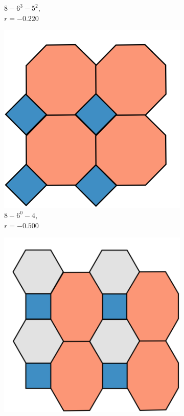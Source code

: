\begin{figure}[h!]
\begin{subfigure}[b]{0.15\textwidth}
         \caption{$8 - 6^3 - 5^2$, \\$r=-0.220$}
         \label{appfig:86352}
     \end{subfigure}
     \hfill     
     
     \vspace{2mm}
      \begin{subfigure}[b]{0.15\textwidth}
         \centering
         \includegraphics[width=\textwidth]{./appendices/figures/crystal_8_60_4.pdf}
         \caption{$8 - 6^0 - 4$, \\$r=-0.500$}
         \label{appfig:8604}
     \end{subfigure}
     \hfill
      \begin{subfigure}[b]{0.15\textwidth}
         \centering
         \includegraphics[width=\textwidth]{./appendices/figures/crystal_8_61_4.pdf}

\end{subfigure}
\end{figure}
